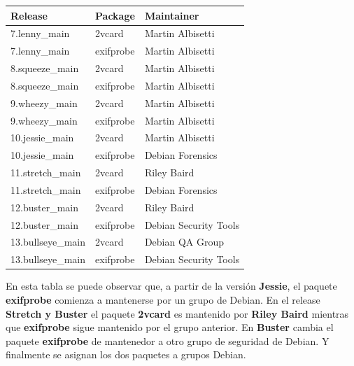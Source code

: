 \documentclass[a4paper, 12pt]{book}
\begin{document}
 \begin{table}[]
 	\begin{tabular}{|l|l|l|}
 		\hline
 		\rowcolor[HTML]{FFFE65} 
 		Release           & Package   & Maintainer            \\ \hline
 		\rowcolor[HTML]{FFFFFF} 
 		7.lenny\_main     & 2vcard    & Martin Albisetti      \\ \hline
 		\rowcolor[HTML]{FFFFFF} 
 		7.lenny\_main     & exifprobe & Martin Albisetti      \\ \hline
 		\rowcolor[HTML]{FFFFFF} 
 		8.squeeze\_main   & 2vcard    & Martin Albisetti      \\ \hline
 		\rowcolor[HTML]{FFFFFF} 
 		8.squeeze\_main   & exifprobe & Martin Albisetti      \\ \hline
 		\rowcolor[HTML]{FFFFFF} 
 		9.wheezy\_main    & 2vcard    & Martin Albisetti      \\ \hline
 		\rowcolor[HTML]{FFFFFF} 
 		9.wheezy\_main    & exifprobe & Martin Albisetti      \\ \hline
 		\rowcolor[HTML]{FFFFFF} 
 		10.jessie\_main   & 2vcard    & Martin Albisetti      \\ \hline
 		\rowcolor[HTML]{FFFFFF} 
 		10.jessie\_main   & exifprobe & Debian Forensics      \\ \hline
 		\rowcolor[HTML]{FFFFFF} 
 		11.stretch\_main  & 2vcard    & Riley Baird           \\ \hline
 		\rowcolor[HTML]{FFFFFF} 
 		11.stretch\_main  & exifprobe & Debian Forensics      \\ \hline
 		\rowcolor[HTML]{FFFFFF} 
 		12.buster\_main   & 2vcard    & Riley Baird           \\ \hline
 		\rowcolor[HTML]{FFFFFF} 
 		12.buster\_main   & exifprobe & Debian Security Tools \\ \hline
 		\rowcolor[HTML]{FFFFFF} 
 		13.bullseye\_main & 2vcard    & Debian QA Group       \\ \hline
 		\rowcolor[HTML]{FFFFFF} 
 		13.bullseye\_main & exifprobe & Debian Security Tools \\ \hline
 	\end{tabular}
 \end{table}
 
En esta tabla se puede observar que, a partir de la versión \textbf{Jessie}, el paquete \textbf{exifprobe} comienza a mantenerse por un grupo de Debian.
En el release \textbf{Stretch y Buster} el paquete \textbf{2vcard} es mantenido por \textbf{Riley Baird} mientras que \textbf{exifprobe} sigue mantenido por el grupo anterior.
En \textbf{Buster} cambia el paquete \textbf{exifprobe} de mantenedor a otro grupo de seguridad de Debian.
Y finalmente se asignan los dos paquetes a grupos Debian.
\end{document}
